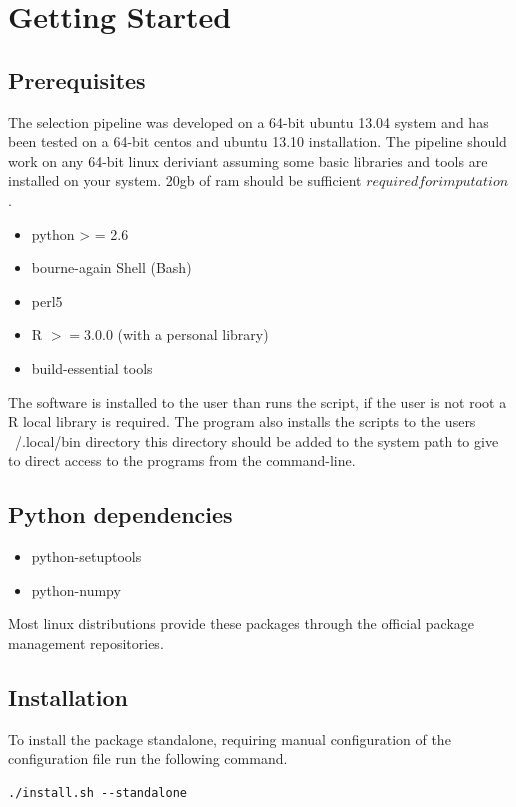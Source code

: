 \section{Getting Started}
\subsection{Prerequisites}
The selection pipeline was developed on a 64-bit ubuntu 13.04 system and has been tested on a 64-bit centos and ubuntu 13.10 installation. The pipeline should work on any 64-bit linux deriviant assuming some basic libraries and tools are installed on your system. 20gb of ram should be sufficient \(required for imputation\).
\begin{itemize}
\item python > = 2.6 
\item bourne-again Shell (Bash)
\item perl5
\item R \( >= 3.0.0 \) (with a personal library)
\item build-essential tools
\end{itemize}
The software is installed to the user than runs the script, if the user is not root a R local library is required. The program also installs the scripts to the users ~/.local/bin directory this directory should be added to the system path to give to direct access to the programs from the command-line.  

\subsection{Python dependencies}
\begin{itemize}
\item python-setuptools
\item python-numpy
\end{itemize}
Most linux distributions provide these packages through the official package management repositories.
\subsection{Installation}
To install the package standalone, requiring manual configuration of the configuration file run the following command.\\

\begin{verbatim}
./install.sh --standalone
\end{verbatim}

